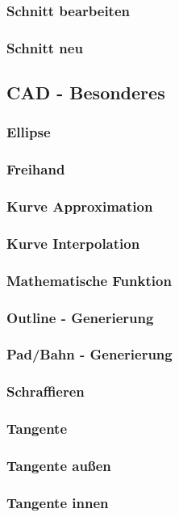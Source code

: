 \documentclass[a4paper]{book}
\begin{document}
			\subsubsection{Schnitt bearbeiten}
			\subsubsection{Schnitt neu}
		\subsection{CAD - Besonderes}
			\subsubsection{Ellipse}
			\subsubsection{Freihand}
			\subsubsection{Kurve Approximation}
			\subsubsection{Kurve Interpolation}
			\subsubsection{Mathematische Funktion}
			\subsubsection{Outline - Generierung}
			\subsubsection{Pad/Bahn - Generierung}
			\subsubsection{Schraffieren}
			\subsubsection{Tangente}
			\subsubsection{Tangente außen}
			\subsubsection{Tangente innen}
\end{document}

